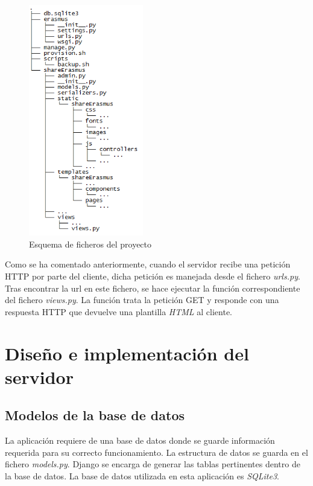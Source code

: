 \documentclass[a4paper, 12pt]{book}
\begin{document}
\begin{figure}[H]
  \centering
  \includegraphics[width=5cm, keepaspectratio]{img/arbol.png}
  \caption{Esquema de ficheros del proyecto}
  \label{fig:arbol}
\end{figure}

Como se ha comentado anteriormente, cuando el servidor recibe una petición HTTP por parte del cliente, dicha petición es manejada desde el fichero \textit{urls.py}. Tras encontrar la url en este fichero, se hace ejecutar la función correspondiente del fichero \textit{views.py}. La función trata la petición GET y  responde con una respuesta HTTP que devuelve una plantilla \textit{HTML} al cliente.


\section{Diseño e implementación del servidor} 
\label{sec:diseno-servidor}

\subsection{Modelos de la base de datos} 
\label{subsec:modelo-base-datos}

La aplicación requiere de una base de datos donde se guarde información requerida para su correcto funcionamiento. La estructura de datos se guarda en el fichero \textit{models.py}. Django se encarga de generar las tablas pertinentes dentro de la base de datos. La base de datos utilizada en esta aplicación es \textit{SQLite3}.
\newline
\end{document}
